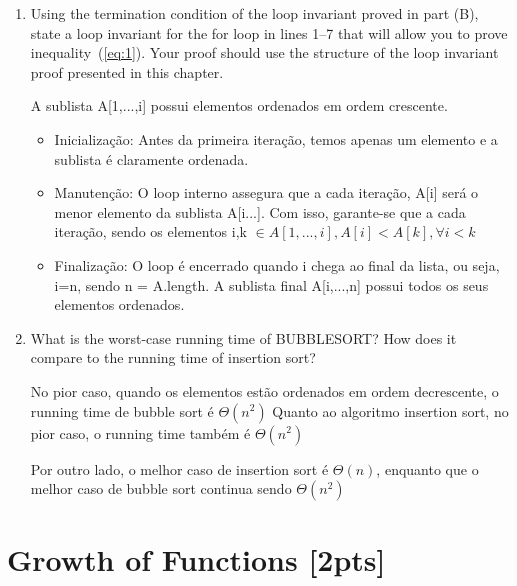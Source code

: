 \documentclass{article}
\begin{document}
\begin{enumerate}[label=\Alph*]
  \item Using the termination condition of the loop invariant proved in part (B), state a loop invariant for the for loop in lines 1–7 that will allow you to prove inequality~(\ref{eq:1}). Your proof should use the structure of the loop invariant proof presented in this chapter.
  
  A sublista A[1,...,i] possui elementos ordenados em ordem crescente.
  
  \begin{itemize}
  	\item Inicialização: Antes da primeira iteração, temos apenas um elemento e a sublista é claramente ordenada.
  	
  	\item Manutenção: O loop interno assegura que a cada iteração, A[i] será o menor elemento da sublista A[i...]. Com isso, garante-se que a cada iteração, sendo os elementos i,k $\in A[1,...,i], A[i]<A[k], \forall i<k$
  	
  	\item Finalização: O loop é encerrado quando i chega ao final da lista, ou seja, i=n, sendo n = A.length. A sublista final A[i,...,n] possui todos os seus elementos ordenados.
  \end{itemize}

  \item What is the worst-case running time of BUBBLESORT? How does it compare to the running time of insertion sort?
  
  No pior caso, quando os elementos estão ordenados em ordem decrescente, o running time de bubble sort é $\Theta (n^2)$
  Quanto ao algoritmo insertion sort, no pior caso, o running time também é $\Theta(n^2)$
  
  Por outro lado, o melhor caso de insertion sort é $\Theta(n)$, enquanto que o melhor caso de bubble sort continua sendo $\Theta(n^2)$
  
\end{enumerate}


\section{Growth of Functions [2pts]}
\end{document}
